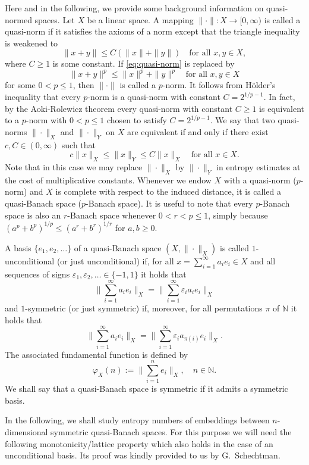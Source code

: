 \documentclass[a4paper,12pt]{article}
\theoremstyle{definition}
\newcommand{\IN}{\mathbb{N}}
\begin{document}
Here and in the following, we provide some background information on quasi-normed spaces. Let $X$ be a linear space. A mapping $\|\cdot\|\colon X\to [0,\infty)$ is called a quasi-norm if it satisfies the axioms of a norm except that the triangle inequality is weakened to
\begin{equation} \label{eq:quasi-norm}
	\|x+y\|\le C(\|x\|+\|y\|)\quad \text{for all }x,y\in X,
\end{equation}
where $C\ge 1$ is some constant. If \eqref{eq:quasi-norm} is replaced by
\begin{equation} \label{eq:p-norm}
	\|x+y\|^p\le \|x\|^p+\|y\|^p\quad \text{for all }x,y\in X
\end{equation}
for some $0<p\le 1$, then $\|\cdot\|$ is called a $p$-norm. It follows from Hölder's inequality that every $p$-norm is a quasi-norm with constant $C=2^{1/p-1}$. In fact, by the Aoki-Rolewicz theorem \cite{Aok42,Rol57} every quasi-norm with constant $C\ge 1$ is equivalent to a $p$-norm with $0<p\le 1$ chosen to satisfy $C=2^{1/p-1}$. We say that two quasi-norms $\|\cdot\|_X$ and $\|\cdot\|_Y$ on $X$ are equivalent if and only if there exist $c,C\in(0,\infty)$ such that
\[
c\|x\|_X\le \|x\|_Y\le C\|x\|_X\quad \text{for all }x\in X. 
\]
Note that in this case we may replace $\|\cdot\|_X$ by $\|\cdot\|_Y$ in entropy estimates at the cost of multiplicative constants. Whenever we endow $X$ with a quasi-norm ($p$-norm) and $X$ is complete with respect to the induced distance, it is called a quasi-Banach space ($p$-Banach space). It is useful to note that every $p$-Banach space is also an $r$-Banach space whenever $0<r<p\le 1$, simply because $(a^p+b^p)^{1/p}\le (a^r+b^r)^{1/r}$ for $a,b\ge 0$.

A basis $\{e_1,e_2,\dots\}$ of a quasi-Banach space $(X,\|\cdot\|_X)$ is called $1$-unconditional (or just unconditional) if, for all $x=\sum_{i=1}^{\infty}a_i e_i\in X$ and all sequences of signs $\varepsilon_1,\varepsilon_2,\dots \in\{-1,1\}$ it holds that
\[
\Big\|\sum_{i=1}^{\infty}a_ie_i\Big\|_{X}
=\Big\|\sum_{i=1}^{\infty}\varepsilon_i a_ie_i\Big\|_{X}
\]
and $1$-symmetric (or just symmetric) if, moreover, for all permutations $\pi$ of $\IN$ it holds that
\[
\Big\|\sum_{i=1}^{\infty}a_ie_i\Big\|_{X}
=\Big\|\sum_{i=1}^{\infty}\varepsilon_i a_{\pi(i)}e_i\Big\|_{X}.
\]
The associated fundamental function is defined by
\[
\varphi_X(n)
:=\Big\|\sum_{i=1}^{n}e_i\Big\|_X,\quad n\in\IN.
\]
We shall say that a quasi-Banach space is symmetric if it admits a symmetric basis.

In the following, we shall study entropy numbers of embeddings between $n$-dimensional symmetric quasi-Banach spaces. For this purpose we will need the following monotonicity/lattice property which also holds in the case of an unconditional basis. Its proof was kindly provided to us by G.~Schechtman.%
\end{document}
